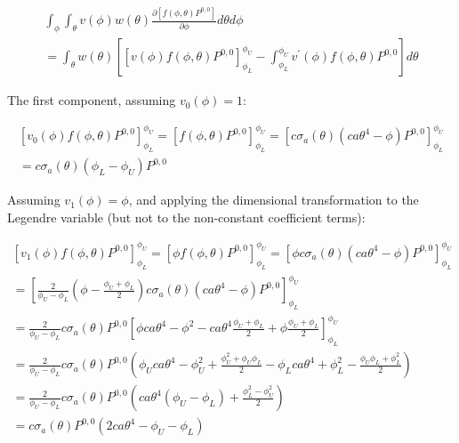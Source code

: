 \documentclass[12pt,a4paper,pagesize=pdftex]{scrartcl}
\begin{document}
\begin{multline*}
    \int_\phi \int_\theta v\left(\phi\right) w\left(\theta\right) \frac{\partial \left[f\left(\phi, \theta\right) P^{0,0}\right]}{\partial \phi} d\theta d\phi \\
    = \int_\theta w\left(\theta\right) \left[ \left[ v\left(\phi\right) f\left(\phi, \theta\right) P^{0,0}\right]_{\phi_L}^{\phi_U} - \int_{\phi_L}^{\phi_U} v^\prime\left(\phi\right) f\left(\phi, \theta\right) P^{0,0}\right] d\theta
\end{multline*}

The first component, assuming \(v_0\left(\phi\right) = 1\):

\begin{multline*}
    \left[v_0\left(\phi\right) f\left(\phi, \theta\right) P^{0,0}\right]_{\phi_L}^{\phi_U} = \left[ f\left(\phi, \theta\right)P^{0,0} \right]_{\phi_L}^{\phi_U} = \left[c \sigma_a\left(\theta\right) \left(c a \theta^4 - \phi\right) P^{0,0}\right]_{\phi_L}^{\phi_U} \\
    = c \sigma_a \left(\theta\right) \left(\phi_L - \phi_U\right) P^{0,0}
\end{multline*}

Assuming \(v_1\left(\phi\right) = \phi\), and applying the dimensional transformation to the Legendre variable (but not to the non-constant coefficient terms):

\begin{multline*}
    \left[v_1\left(\phi\right) f\left(\phi,\theta\right) P^{0,0}\right]_{\phi_L}^{\phi_U} = \left[\phi f\left(\phi, \theta\right)P^{0,0}\right]_{\phi_L}^{\phi_U} = \left[\phi c \sigma_a\left(\theta\right) \left(c a \theta^4 - \phi\right) P^{0,0}\right]_{\phi_L}^{\phi_U} \\
    = \left[\frac{2}{\phi_U - \phi_L} \left(\phi - \frac{\phi_U + \phi_L}{2}\right) c \sigma_a\left(\theta\right) \left(c a \theta^4 - \phi\right) P^{0,0}\right]_{\phi_L}^{\phi_U} \\
    = \frac{2}{\phi_U - \phi_L} c \sigma_a\left(\theta\right) P^{0,0} \left[\phi c a \theta^4 - \phi^2 - c a \theta^4 \frac{\phi_U + \phi_L}{2} + \phi \frac{\phi_U + \phi_L}{2}\right]_{\phi_L}^{\phi_U} \\
    = \frac{2}{\phi_U - \phi_L} c \sigma_a\left(\theta\right) P^{0,0} \left(\phi_U c a \theta^4 - \phi_U^2 + \frac{\phi_U^2 + \phi_U \phi_L}{2} - \phi_L c a \theta^4 + \phi_L^2 - \frac{\phi_U \phi_L + \phi_L^2}{2} \right) \\
    = \frac{2}{\phi_U - \phi_L} c \sigma_a\left(\theta\right) P^{0,0} \left(c a \theta^4 \left(\phi_U - \phi_L\right) + \frac{\phi_L^2 - \phi_U^2}{2}\right) \\
    = c \sigma_a\left(\theta\right) P^{0,0} \left(2 c a \theta^4  - \phi_U - \phi_L\right)
\end{multline*}
\end{document}
